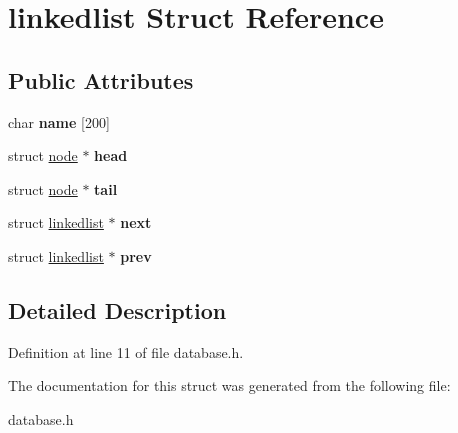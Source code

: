 \hypertarget{structlinkedlist}{
\section{linkedlist Struct Reference}
\label{structlinkedlist}
}
\subsection*{Public Attributes}
\begin{DoxyCompactItemize}
\item 
\hypertarget{structlinkedlist_a3a95fbda771b61081d93c8a2f6075920}{
char {\bfseries name} \mbox{[}200\mbox{]}}
\label{structlinkedlist_a3a95fbda771b61081d93c8a2f6075920}

\item 
\hypertarget{structlinkedlist_ab5f350ff18822b687d75a55d50ad4375}{
struct \hyperlink{structnode}{node} $\ast$ {\bfseries head}}
\label{structlinkedlist_ab5f350ff18822b687d75a55d50ad4375}

\item 
\hypertarget{structlinkedlist_a51871c566912e2748ab469283d05fddf}{
struct \hyperlink{structnode}{node} $\ast$ {\bfseries tail}}
\label{structlinkedlist_a51871c566912e2748ab469283d05fddf}

\item 
\hypertarget{structlinkedlist_a1cd8b31b9e357b1b2b4b862eeca6863c}{
struct \hyperlink{structlinkedlist}{linkedlist} $\ast$ {\bfseries next}}
\label{structlinkedlist_a1cd8b31b9e357b1b2b4b862eeca6863c}

\item 
\hypertarget{structlinkedlist_acfe28edfbfca94248d2552a19efbd2a6}{
struct \hyperlink{structlinkedlist}{linkedlist} $\ast$ {\bfseries prev}}
\label{structlinkedlist_acfe28edfbfca94248d2552a19efbd2a6}

\end{DoxyCompactItemize}


\subsection{Detailed Description}


Definition at line 11 of file database.h.



The documentation for this struct was generated from the following file:\begin{DoxyCompactItemize}
\item 
database.h\end{DoxyCompactItemize}
